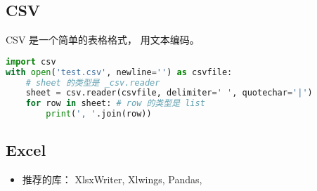 
\begin{issues}
\issueDraft
\end{issues}

\subsection{CSV}
CSV 是一个简单的表格格式， 用文本编码。
\begin{lstlisting}[language=python]
import csv
with open('test.csv', newline='') as csvfile:
    # sheet 的类型是 _csv.reader
    sheet = csv.reader(csvfile, delimiter=' ', quotechar='|')
    for row in sheet: # row 的类型是 list
        print(', '.join(row))
\end{lstlisting}

\subsection{Excel}
\begin{itemize}
\item 推荐的库： XlsxWriter, Xlwings, Pandas, 
\end{itemize}
